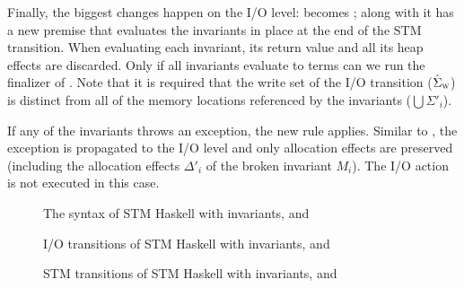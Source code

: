 Finally, the biggest changes happen on the I/O level:
 becomes ;
along with  it has a new premise that evaluates the invariants in place at the end of the STM transition.
When evaluating each invariant, its return value and all its heap effects are discarded.
Only if all invariants evaluate to  terms can we run the finalizer of .
Note that it is required that the write set of the I/O transition ($\hat{\Sigma}_\textsc{w}$) is distinct from all of the memory locations referenced by the invariants ($\bigcup\Sigma'_i$).

If any of the invariants throws an exception, the new rule  applies.
Similar to , the exception is propagated to the I/O level and only allocation effects are preserved (including the allocation effects $\Delta'_i$ of the broken invariant $M_i$).
The I/O action is not executed in this case.

\begin{figure}[p]

\caption{The syntax of STM Haskell with invariants,  and }
\label{fig:final-syntax}
\end{figure}

\begin{figure}[p]

\caption{I/O transitions of STM Haskell with invariants,  and }
\label{fig:final-io}
\end{figure}

\begin{figure}[p]

\caption{STM transitions of STM Haskell with invariants,  and }
\label{fig:final-stm}
\end{figure}

\clearpage